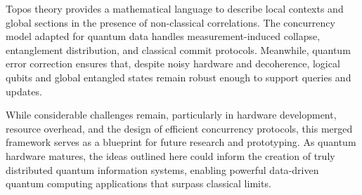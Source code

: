 \documentclass[11pt]{article}
\begin{document}
Topos theory provides a mathematical language to describe local contexts and global sections in the presence of non-classical correlations. The concurrency model adapted for quantum data handles measurement-induced collapse, entanglement distribution, and classical commit protocols. Meanwhile, quantum error correction ensures that, despite noisy hardware and decoherence, logical qubits and global entangled states remain robust enough to support queries and updates.

While considerable challenges remain, particularly in hardware development, resource overhead, and the design of efficient concurrency protocols, this merged framework serves as a blueprint for future research and prototyping. As quantum hardware matures, the ideas outlined here could inform the creation of truly distributed quantum information systems, enabling powerful data-driven quantum computing applications that surpass classical limits.

\bigskip
\end{document}
